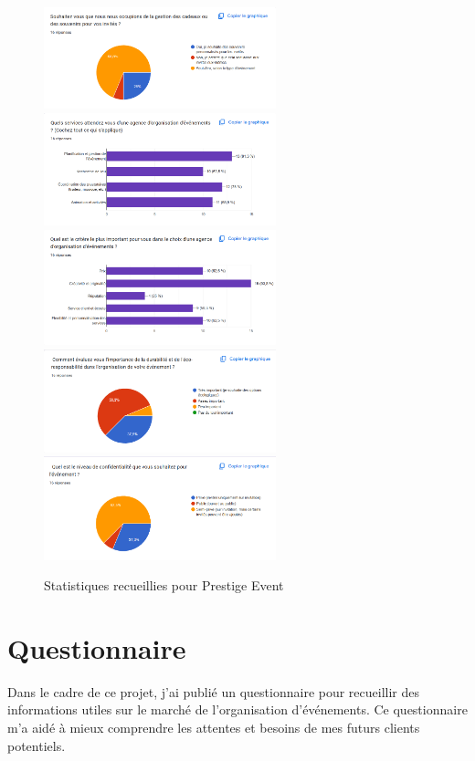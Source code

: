 \documentclass[a4paper,12pt]{article}
\begin{document}
\begin{figure}[H]
    \centering
    \includegraphics[width=0.6\textwidth]{stat1.png} %
    \includegraphics[width=0.6\textwidth]{stat2.png}
    \includegraphics[width=0.6\textwidth]{stat3.png} \\[0.5cm]
    \includegraphics[width=0.6\textwidth]{stat4.png}
    \includegraphics[width=0.6\textwidth]{stat5.png}
    \caption{Statistiques recueillies pour Prestige Event}
    \label{fig:stats}
\end{figure}

\section*{\color{myblue} Questionnaire}
Dans le cadre de ce projet, j'ai publié un questionnaire pour recueillir des informations utiles sur le marché de l'organisation d'événements. Ce questionnaire m'a aidé à mieux comprendre les attentes et besoins de mes futurs clients potentiels.  
\end{document}
